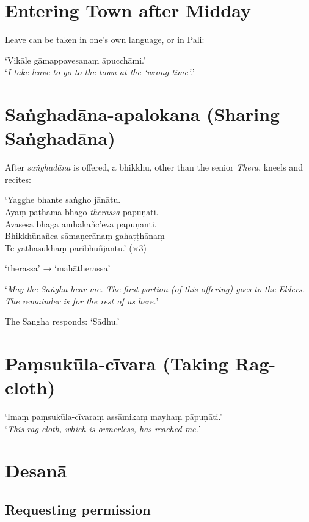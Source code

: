 \section{Entering Town after Midday}

Leave can be taken in one's own language, or in Pali:

‘Vikāle gāmappavesanaṃ āpucchāmi.’\\
‘\emph{I take leave to go to the town at the ‘wrong time’.}’ 

\section{Saṅghadāna-apalokana (Sharing Saṅghadāna)}

After \emph{saṅghadāna} is offered, a bhikkhu, other than the senior \emph{Thera},
kneels and recites:


‘Yagghe bhante saṅgho jānātu.\\
Ayaṃ paṭhama-bhāgo \emph{therassa} pāpuṇāti.\\
Avasesā bhāgā amhākañc’eva pāpuṇanti.\\
Bhikkhūnañca sāmaṇerānaṃ gahaṭṭhānaṃ\\
Te yathāsukhaṃ paribhuñjantu.’ (×3)

‘therassa’ → ‘mahātherassa’


‘\emph{May the Saṅgha hear me. The first portion (of this offering) goes to the
  Elders. The remainder is for the rest of us here.}’

The Sangha responds: ‘Sādhu.’ 

\section{Paṃsukūla-cīvara (Taking Rag-cloth)}

‘Imaṃ paṃsukūla-cīvaraṃ assāmikaṃ mayhaṃ pāpuṇāti.’\\
‘\emph{This rag-cloth, which is ownerless, has reached me.}’

\section{Desanā}

\subsection{Requesting permission}

